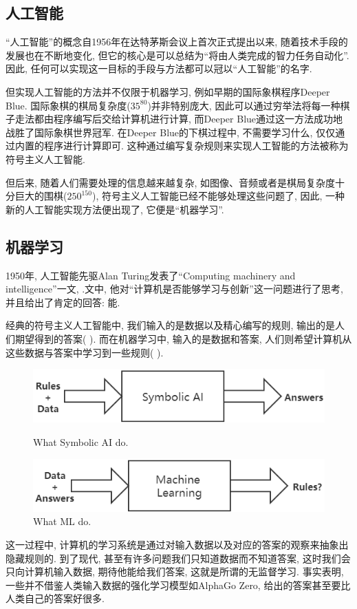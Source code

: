 \documentclass[lang=cn,11pt,a4paper]{elegantpaper}
\begin{document}
\subsection{人工智能}
\par “人工智能”的概念自1956年在达特茅斯会议\cite{Dartmouth}上首次正式提出以来, 随着技术手段的发展也在不断地变化, 但它的核心是可以总结为“将由人类完成的智力任务自动化”. 因此, 任何可以实现这一目标的手段与方法都可以冠以“人工智能”的名字. 
\par 但实现人工智能的方法并不仅限于机器学习, 例如早期的国际象棋程序Deeper Blue. 国际象棋的棋局复杂度($35^{80}$\cite{artic})并非特别庞大, 因此可以通过穷举法将每一种棋子走法都由程序编写后交给计算机进行计算, 而Deeper Blue通过这一方法成功地战胜了国际象棋世界冠军. 在Deeper Blue的下棋过程中, 不需要学习什么, 仅仅通过内置的程序进行计算即可. 这种通过编写复杂规则来实现人工智能的方法被称为符号主义人工智能. 
\par 但后来, 随着人们需要处理的信息越来越复杂, 如图像、音频或者是棋局复杂度十分巨大的围棋($250^{150}$\cite{artic}), 符号主义人工智能已经不能够处理这些问题了, 因此, 一种新的人工智能实现方法便出现了, 它便是“机器学习”.
\subsection{机器学习}
\par 1950年, 人工智能先驱Alan Turing发表了“Computing machinery and intelligence”一文\cite{Turing2009}, .文中, 他对“计算机是否能够学习与创新”这一问题进行了思考, 并且给出了肯定的回答: 能. 
\par 经典的符号主义人工智能中, 我们输入的是数据以及精心编写的规则, 输出的是人们期望得到的答案( ). 而在机器学习中, 输入的是数据和答案, 人们则希望计算机从这些数据与答案中学习到一些规则( ). 
\begin{figure}[htbp]
	\centering
	\begin{minipage}[t]{0.45\textwidth}
	\centering
	\includegraphics[width=1\textwidth]{Old}
	\caption{What Symbolic AI do.\label{fig:old}}
	\end{minipage}
	\begin{minipage}[t]{0.45\textwidth}
	\centering
	\includegraphics[width=1\textwidth]{Now}
	\caption{What ML do.\label{fig:now}}
	\end{minipage}
\end{figure}
\par 这一过程中, 计算机的学习系统是通过对输入数据以及对应的答案的观察来抽象出隐藏规则的. 到了现代, 甚至有许多问题我们只知道数据而不知道答案, 这时我们会只向计算机输入数据, 期待他能给我们答案, 这就是所谓的无监督学习. 事实表明, 一些并不借鉴人类输入数据的强化学习模型如AlphaGo Zero, 给出的答案甚至要比人类自己的答案好很多. 
\end{document}
